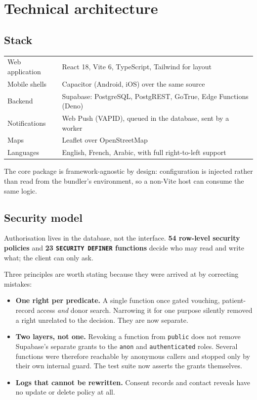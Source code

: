 \documentclass[11pt,a4paper]{article}
\begin{document}
\section{Technical architecture}

\subsection{Stack}

\begin{center}
\begin{tabularx}{\textwidth}{@{}lX@{}}
\toprule
Web application & React 18, Vite 6, TypeScript, Tailwind for layout \\
Mobile shells & Capacitor (Android, iOS) over the same source \\
Backend & Supabase: PostgreSQL, PostgREST, GoTrue, Edge Functions (Deno) \\
Notifications & Web Push (VAPID), queued in the database, sent by a worker \\
Maps & Leaflet over OpenStreetMap \\
Languages & English, French, Arabic, with full right-to-left support \\
\bottomrule
\end{tabularx}
\end{center}

The core package is framework-agnostic by design: configuration is injected
rather than read from the bundler's environment, so a non-Vite host can consume
the same logic.

\subsection{Security model}

Authorisation lives in the database, not the interface. \textbf{54 row-level
security policies} and \textbf{23 \texttt{SECURITY DEFINER} functions} decide
who may read and write what; the client can only ask.

Three principles are worth stating because they were arrived at by correcting
mistakes:

\begin{itemize}[leftmargin=1.4em]
  \item \textbf{One right per predicate.} A single function once gated
        vouching, patient-record access \emph{and} donor search. Narrowing it
        for one purpose silently removed a right unrelated to the decision.
        They are now separate.
  \item \textbf{Two layers, not one.} Revoking a function from
        \texttt{public} does not remove Supabase's separate grants to the
        \texttt{anon} and \texttt{authenticated} roles. Several functions were
        therefore reachable by anonymous callers and stopped only by their own
        internal guard. The test suite now asserts the grants themselves.
  \item \textbf{Logs that cannot be rewritten.} Consent records and contact
        reveals have no update or delete policy at all.
\end{itemize}
\end{document}
